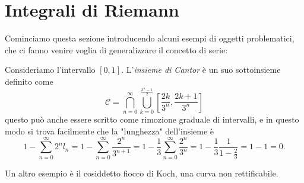\documentclass[11pt]{scrartcl}
\begin{document}
	\newpage
	
	\section{Integrali di Riemann}
	
	Cominciamo questa sezione introducendo alcuni esempi di oggetti problematici, che ci fanno venire voglia di generalizzare il concetto di serie:
	\begin{example}
		Consideriamo l'intervallo $[0,1]$. L'\textit{insieme di Cantor} è un suo sottoinsieme definito come
		$$\mathcal{C}=\bigcap_{n=0}^\infty\bigcup_{k=0}^{\frac{3^n-1}{2}}\left[\frac{2k}{3^n},\frac{2k+1}{3^n}\right]$$
		questo può anche essere scritto come rimozione graduale di intervalli, e in questo modo si trova facilmente che la "lunghezza" dell'insieme è 
		$$1-\sum_{n=0}^\infty 2^nl_n=1-\sum_{n=0}^{\infty}\frac{2^n}{3^{n+1}}=1-\frac{1}{3}\sum_{n=0}^{\infty}\frac{2^n}{3^n}=1-\frac{1}{3}\frac{1}{1-\frac{2}{3}}=1-1=0.$$
	\end{example}
	Un altro esempio è il cosiddetto fiocco di Koch, una curva non rettificabile.
\end{document}

